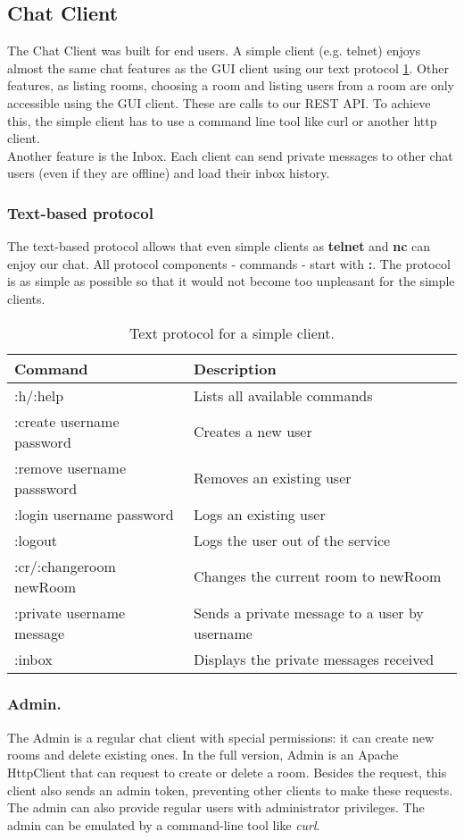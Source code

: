 \subsection{Chat Client}
\label{subsec:chatclient}
The Chat Client was built for end users. A simple client (e.g. telnet) enjoys almost the same chat features as the GUI client using our text protocol \ref{tab:textprotocol}.
Other features, as listing rooms, choosing a room
and listing users from a room are only accessible using the GUI client. These are calls to our REST API. To achieve this, the simple client has to use a command line tool like curl or another http client. \\
Another feature is the Inbox. Each client can send private messages to other chat users (even if they are offline) and load their inbox history.

\subsubsection{Text-based protocol}
\label{subsec:textprotocol}
The text-based protocol allows that even simple clients as \textbf{telnet} and \textbf{nc} can enjoy our chat. All protocol components - commands -  start with \textbf{:}. The protocol is as simple as possible so that it would not become too unpleasant for the simple clients.


\begin{table}[h]
\centering
\begin{tabular}{l|l}
\textbf{Command} & \textbf{Description}\\
\hline
\hline
 :h/:help & Lists all available commands \\
 \hline
 :create username password & Creates a new user\\
 \hline
 :remove username passsword & Removes an existing user \\
 \hline
 :login username password & Logs an existing user \\
 \hline 
 :logout & Logs the user out of the service \\
 \hline
 :cr/:changeroom newRoom & Changes the current room to newRoom  \\
 \hline
 :private username message & Sends a private message to a user by username   \\
 \hline
 :inbox & Displays the private messages received
\end{tabular}

\caption{Text protocol for a simple client.}
\label{tab:textprotocol}
\end{table}


\subsubsection{Admin.}
The Admin is a regular chat client with special permissions: it can create new rooms and delete existing ones. In the full version, Admin is an Apache HttpClient that can request to create or delete a room. Besides the request, this client also sends an admin token, preventing other clients to make these requests. The admin can also provide regular users with administrator privileges. The admin can be emulated by a command-line tool like \emph{curl}.